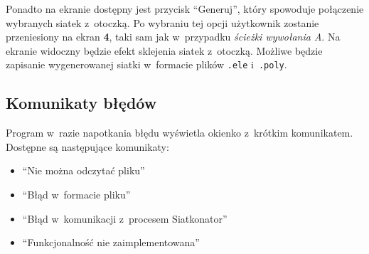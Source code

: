 \documentclass[a4paper]{article}
\begin{document}
Ponadto na ekranie dostępny jest przycisk ``Generuj'', który spowoduje połączenie wybranych siatek z~otoczką.
Po wybraniu tej opcji użytkownik zostanie przeniesiony na ekran \textbf{4}, taki sam jak w~przypadku \emph{ścieżki wywołania A}.
Na ekranie widoczny będzie efekt sklejenia siatek z~otoczką.
Możliwe będzie zapisanie wygenerowanej siatki w~formacie plików \texttt{.ele} i~\texttt{.poly}.

\subsection{Komunikaty błędów}
Program w~razie napotkania błędu wyświetla okienko z~krótkim komunikatem. Dostępne są następujące komunikaty:

\begin{itemize}
  \item ``Nie można odczytać pliku''
  \item ``Błąd w~formacie pliku''
  \item ``Błąd w~komunikacji z~procesem Siatkonator''
  \item ``Funkcjonalność nie zaimplementowana''
\end{itemize}
\end{document}
